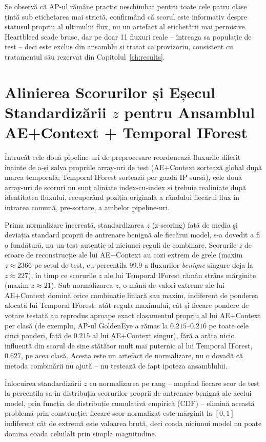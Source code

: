 Se observă că AP-ul rămâne practic neschimbat pentru toate cele patru clase țintă sub etichetarea mai strictă, confirmând că scorul este informativ despre statusul propriu al ultimului flux, nu un artefact al etichetării mai permisive.
Heartbleed scade brusc, dar pe doar 11 fluxuri reale -- întreaga sa populație de test -- deci este exclus din ansamblu și tratat ca provizoriu, consistent cu tratamentul său rezervat din Capitolul~\ref{ch:results}.

\chapter{Alinierea Scorurilor și Eșecul Standardizării \texorpdfstring{$z$}{z} pentru Ansamblul AE+Context + Temporal IForest}
\label{ch:ensemble-score-alignment}

Întrucât cele două pipeline-uri de preprocesare reordonează fluxurile diferit înainte de a-și salva propriile array-uri de test (AE+Context sortează global după marca temporală; Temporal IForest sortează per gazdă IP sursă), cele două array-uri de scoruri nu sunt aliniate index-cu-index și trebuie realiniate după identitatea fluxului, recuperând poziția originală a rândului fiecărui flux în intrarea comună, pre-sortare, a ambelor pipeline-uri.


Prima normalizare încercată, standardizarea $z$ (z-scoring) față de media și deviația standard proprii de antrenare benignă ale fiecărui model, s-a dovedit a fi o fundătură, nu un test autentic al niciunei reguli de combinare. Scorurile $z$ de eroare de reconstrucție ale lui AE+Context au cozi extrem de grele (maxim $z \approx 2366$ pe setul de test, cu percentila 99.9 a fluxurilor \emph{benigne} singure deja la $z \approx 227$), în timp ce scorurile $z$ ale lui Temporal IForest rămân strâns mărginite (maxim $z \approx 21$). Sub normalizarea $z$, o mână de valori extreme ale lui AE+Context domină orice combinație liniară sau maxim, indiferent de ponderea alocată lui Temporal IForest: atât regula maximului, cât și fiecare pondere de votare testată au reprodus aproape exact clasamentul propriu al lui AE+Context per clasă (de exemplu, AP-ul GoldenEye a rămas la $0.215$--$0.216$ pe toate cele cinci ponderi, față de $0.215$ al lui AE+Context singur), fără a arăta nicio influență din scorul de sine stătător mult mai puternic al lui Temporal IForest, $0.627$, pe acea clasă. Acesta este un artefact de normalizare, nu o dovadă că metoda combinării nu ajută -- nu testează de fapt ipoteza ansamblului.

Înlocuirea standardizării $z$ cu normalizarea pe rang -- mapând fiecare scor de test la percentila sa în distribuția scorurilor proprii de antrenare benignă ale acelui model, prin funcția de distribuție cumulativă empirică (CDF) -- elimină această problemă prin construcție: fiecare scor normalizat este mărginit la $[0,1]$ indiferent cât de extremă este valoarea brută, deci coada niciunui model nu poate domina coada celuilalt prin simpla magnitudine.
